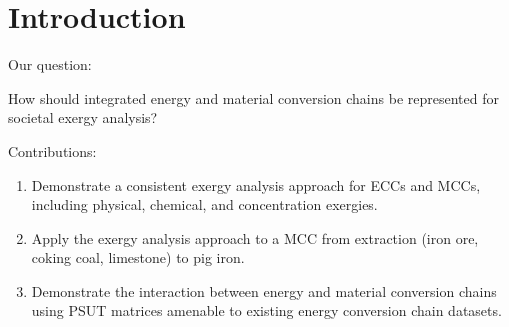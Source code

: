 \documentclass[energies,article,submit,pdftex,moreauthors]{Definitions/mdpi}
\begin{document}


\section{Introduction}
\label{sec:introduction}


Our question:

How should integrated energy and material conversion chains
be represented for societal exergy analysis?


Contributions:

%
\begin{enumerate}

  \item Demonstrate a consistent exergy analysis approach for ECCs and MCCs,
        including physical, chemical, and concentration exergies.

  \item Apply the exergy analysis approach to a MCC
        from extraction (iron ore, coking coal, limestone)
        to pig iron.

  \item Demonstrate the interaction
        between energy and material conversion chains
        using PSUT matrices
        amenable to existing energy conversion chain datasets.

\end{enumerate}
\end{document}
